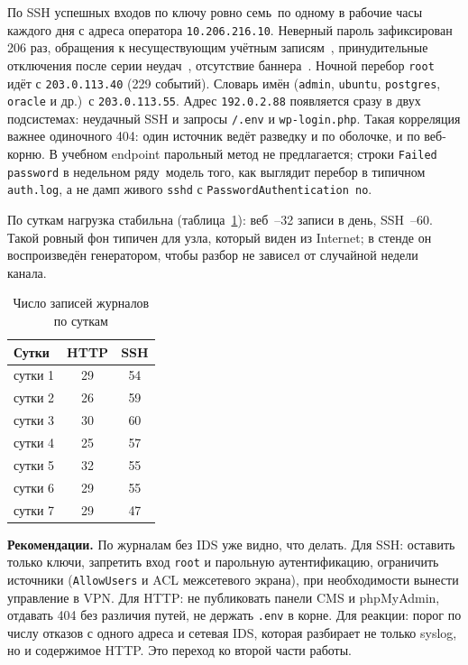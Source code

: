 По SSH успешных входов по ключу ровно семь~\mdash  по одному в рабочие часы каждого дня с адреса оператора \texttt{10.206.216.10}. Неверный пароль зафиксирован 206 раз, обращения к несуществующим учётным записям~, принудительные отключения после серии неудач~, отсутствие баннера~. Ночной перебор \texttt{root} идёт с \texttt{203.0.113.40} (229 событий). Словарь имён (\texttt{admin}, \texttt{ubuntu}, \texttt{postgres}, \texttt{oracle} и др.)~\mdash  с \texttt{203.0.113.55}. Адрес \texttt{192.0.2.88} появляется сразу в двух подсистемах: неудачный SSH и запросы \texttt{/.env} и \texttt{wp-login.php}. Такая корреляция важнее одиночного 404: один источник ведёт разведку и по оболочке, и по веб-корню. В учебном endpoint парольный метод не предлагается; строки \texttt{Failed password} в недельном ряду~\mdash  модель того, как выглядит перебор в типичном \texttt{auth.log}, а не дамп живого \texttt{sshd} с \texttt{PasswordAuthentication no}.

По суткам нагрузка стабильна (таблица~\ref{tab:days}): веб~--32 записи в день, SSH~--60. Такой ровный фон типичен для узла, который виден из Internet; в стенде он воспроизведён генератором, чтобы разбор не зависел от случайной недели канала.

\begin{table}[H]
	\centering
	\begin{tabular}{|l|c|c|}
		\hline
		\textbf{Сутки} & \textbf{HTTP} & \textbf{SSH} \\
		\hline
		сутки 1 & 29 & 54 \\
		\hline
		сутки 2 & 26 & 59 \\
		\hline
		сутки 3 & 30 & 60 \\
		\hline
		сутки 4 & 25 & 57 \\
		\hline
		сутки 5 & 32 & 55 \\
		\hline
		сутки 6 & 29 & 55 \\
		\hline
		сутки 7 & 29 & 47 \\
		\hline
	\end{tabular}
	\caption{Число записей журналов по суткам}
	\label{tab:days}
\end{table}

\textbf{Рекомендации.}
По журналам без IDS уже видно, что делать. Для SSH: оставить только ключи, запретить вход \texttt{root} и парольную аутентификацию, ограничить источники (\texttt{AllowUsers} и ACL межсетевого экрана), при необходимости вынести управление в VPN. Для HTTP: не публиковать панели CMS и phpMyAdmin, отдавать 404 без различия путей, не держать \texttt{.env} в корне. Для реакции: порог по числу отказов с одного адреса и сетевая IDS, которая разбирает не только syslog, но и содержимое HTTP. Это переход ко второй части работы.
